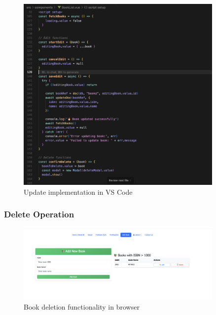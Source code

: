 \documentclass[11pt,a4paper]{article}
\begin{document}
 \begin{figure}[H]
    \centering
    \includegraphics[width=0.9\textwidth]{update_book_code.png}
    \caption{Update implementation in VS Code}
    \label{fig:update_book_code}
 \end{figure}

\subsubsection{Delete Operation}
 \begin{figure}[H]
    \centering
    \includegraphics[width=0.9\textwidth]{delete_book_browser.png}
    \caption{Book deletion functionality in browser}
    \label{fig:delete_book_browser}
 \end{figure}
\end{document}
